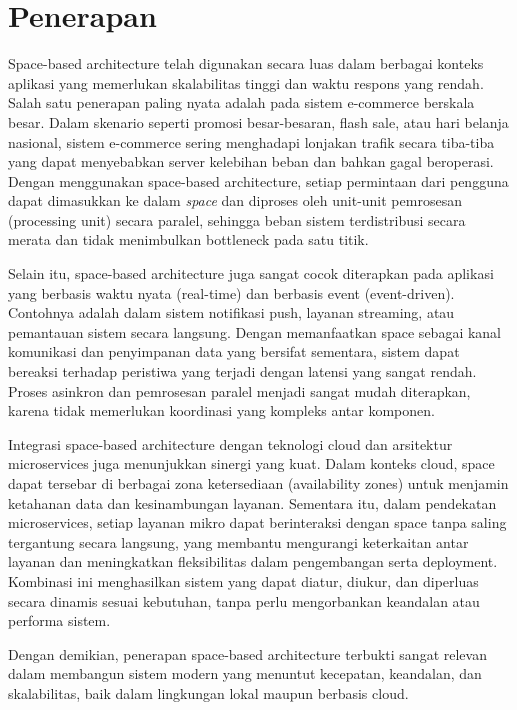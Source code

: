 \section{Penerapan}

Space-based architecture telah digunakan secara luas dalam berbagai konteks aplikasi yang memerlukan skalabilitas tinggi dan waktu respons yang rendah. Salah satu penerapan paling nyata adalah pada sistem e-commerce berskala besar. Dalam skenario seperti promosi besar-besaran, flash sale, atau hari belanja nasional, sistem e-commerce sering menghadapi lonjakan trafik secara tiba-tiba yang dapat menyebabkan server kelebihan beban dan bahkan gagal beroperasi. Dengan menggunakan space-based architecture, setiap permintaan dari pengguna dapat dimasukkan ke dalam \textit{space} dan diproses oleh unit-unit pemrosesan (processing unit) secara paralel, sehingga beban sistem terdistribusi secara merata dan tidak menimbulkan bottleneck pada satu titik.

Selain itu, space-based architecture juga sangat cocok diterapkan pada aplikasi yang berbasis waktu nyata (real-time) dan berbasis event (event-driven). Contohnya adalah dalam sistem notifikasi push, layanan streaming, atau pemantauan sistem secara langsung. Dengan memanfaatkan space sebagai kanal komunikasi dan penyimpanan data yang bersifat sementara, sistem dapat bereaksi terhadap peristiwa yang terjadi dengan latensi yang sangat rendah. Proses asinkron dan pemrosesan paralel menjadi sangat mudah diterapkan, karena tidak memerlukan koordinasi yang kompleks antar komponen.

Integrasi space-based architecture dengan teknologi cloud dan arsitektur microservices juga menunjukkan sinergi yang kuat. Dalam konteks cloud, space dapat tersebar di berbagai zona ketersediaan (availability zones) untuk menjamin ketahanan data dan kesinambungan layanan. Sementara itu, dalam pendekatan microservices, setiap layanan mikro dapat berinteraksi dengan space tanpa saling tergantung secara langsung, yang membantu mengurangi keterkaitan antar layanan dan meningkatkan fleksibilitas dalam pengembangan serta deployment. Kombinasi ini menghasilkan sistem yang dapat diatur, diukur, dan diperluas secara dinamis sesuai kebutuhan, tanpa perlu mengorbankan keandalan atau performa sistem.

Dengan demikian, penerapan space-based architecture terbukti sangat relevan dalam membangun sistem modern yang menuntut kecepatan, keandalan, dan skalabilitas, baik dalam lingkungan lokal maupun berbasis cloud.


